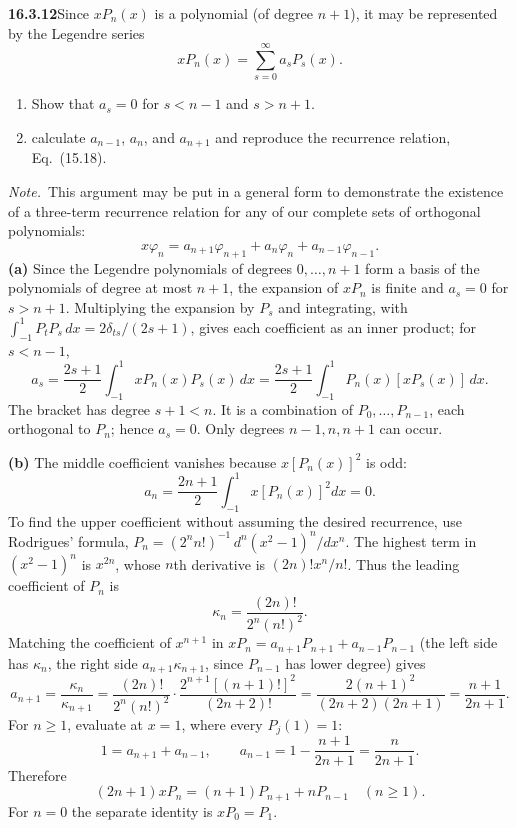 \par\bigskip
\noindent\textbf{16.3.12}\quad Since $xP_{n}(x)$ is a polynomial (of
degree $n+1$), it may be represented by the Legendre series
\[
xP_{n}(x)=\sum_{s=0}^{\infty}a_{s}P_{s}(x).
\]
\begin{enumerate}
\item[(a)] Show that $a_{s}=0$ for $s<n-1$ and $s>n+1$.
\item[(b)]  calculate $a_{n-1}$, $a_n$,
and $a_{n+1}$ and reproduce the recurrence relation, Eq.~(15.18).
\end{enumerate}
\par\emph{Note.}~This argument may be put in a general form to
demonstrate the existence of a three-term recurrence relation for any
of our complete sets of orthogonal polynomials:
\[
x\varphi_{n}=a_{n+1}\varphi_{n+1}+a_{n}\varphi_{n}
+a_{n-1}\varphi_{n-1}.
\]
\solution
\textbf{(a)} Since the Legendre polynomials of degrees $0,\ldots,n+1$ form a
basis of the polynomials of degree at most $n+1$, the expansion of
$xP_n$ is finite and $a_s=0$ for $s>n+1$.
Multiplying the expansion by $P_s$ and integrating, with
$\int_{-1}^1P_tP_s\,dx=2\delta_{ts}/(2s+1)$, gives each coefficient
as an inner product; for $s<n-1$,
\[
a_s=\frac{2s+1}{2}\int_{-1}^1xP_n(x)P_s(x)\,dx
=\frac{2s+1}{2}\int_{-1}^1P_n(x)[xP_s(x)]\,dx.
\]
The bracket has degree $s+1<n$. It is a combination of
$P_0,\ldots,P_{n-1}$, each orthogonal to $P_n$; hence $a_s=0$.
Only degrees $n-1,n,n+1$ can occur.

\textbf{(b)} The middle coefficient vanishes because
$x[P_n(x)]^2$ is odd:
\[
a_n=\frac{2n+1}{2}\int_{-1}^1x[P_n(x)]^2dx=0.
\]
To find the upper coefficient without assuming the desired
recurrence, use Rodrigues' formula,
$P_n=(2^nn!)^{-1}\,d^n(x^2-1)^n/dx^n$. The highest term in
$(x^2-1)^n$ is $x^{2n}$, whose $n$th derivative is
$(2n)!x^n/n!$. Thus the leading coefficient of $P_n$ is
\[
\kappa_n=\frac{(2n)!}{2^n(n!)^2}.
\]
Matching the coefficient of $x^{n+1}$ in $xP_n=a_{n+1}P_{n+1}
+a_{n-1}P_{n-1}$ (the left side has $\kappa_n$, the right side
$a_{n+1}\kappa_{n+1}$, since $P_{n-1}$ has lower degree) gives
\[
a_{n+1}=\frac{\kappa_n}{\kappa_{n+1}}
=\frac{(2n)!}{2^n(n!)^2}\cdot\frac{2^{n+1}[(n+1)!]^2}{(2n+2)!}
=\frac{2(n+1)^2}{(2n+2)(2n+1)}
=\frac{n+1}{2n+1}.
\]
For $n\ge1$, evaluate at $x=1$, where every $P_j(1)=1$:
\[
1=a_{n+1}+a_{n-1},\qquad
a_{n-1}=1-\frac{n+1}{2n+1}=\frac{n}{2n+1}.
\]
Therefore
\[
\boxed{(2n+1)xP_n=(n+1)P_{n+1}+nP_{n-1}\quad(n\ge1)}.
\]
For $n=0$ the separate identity is $xP_0=P_1$.

